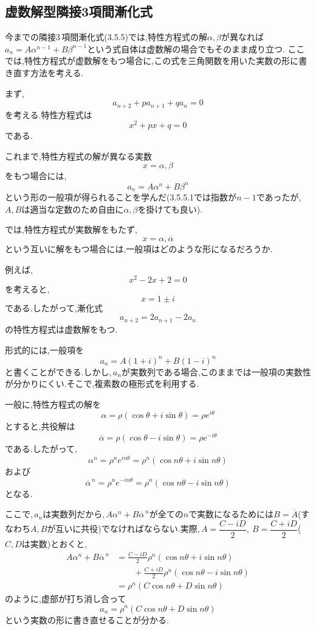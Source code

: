 \subsection{虚数解型隣接3項間漸化式}
  今までの隣接3\,項間漸化式(3.5.5)では,特性方程式の解$\alpha,\beta$が異なれば$a_n=A\alpha^{n-1}+B\beta^{n-1}$という式自体は虚数解の場合でもそのまま成り立つ.
  ここでは,特性方程式が虚数解をもつ場合に,この式を三角関数を用いた実数の形に書き直す方法を考える.

  まず,
  \[
    a_{n+2}+pa_{n+1}+qa_n=0
  \]
  を考える.特性方程式は
  \[
    x^2+px+q=0
  \]
  である.

  これまで,特性方程式の解が異なる実数
  \[
    x=\alpha,\beta
  \]
  をもつ場合には,
  \[
    a_n=A\alpha^n+B\beta^n
  \]
  という形の一般項が得られることを学んだ(3.5.5.1では指数が$n-1$であったが,\,$A,B$は適当な定数のため自由に$\alpha,\beta$を掛けても良い).

  では,特性方程式が実数解をもたず,
  \[
    x=\alpha,\overline{\alpha}
  \]
  という互いに解をもつ場合には,一般項はどのような形になるだろうか.

  例えば,
  \[
    x^2-2x+2=0
  \]
  を考えると,
  \[
    x=1\pm i
  \]
  である.したがって,漸化式
  \[
    a_{n+2}=2a_{n+1}-2a_n
  \]
  の特性方程式は虚数解をもつ.

  形式的には,一般項を
  \[
    a_n=A(1+i)^n+B(1-i)^n
  \]
  と書くことができる.しかし,\,$a_n$が実数列である場合,このままでは一般項の実数性が分かりにくい.そこで,複素数の極形式を利用する.

  一般に,特性方程式の解を
  \[
    \alpha=\rho(\cos\theta+i\sin\theta)=\rho e^{i\theta}
  \]
  とすると,共役解は
  \[
    \overline{\alpha}=\rho(\cos\theta-i\sin\theta)=\rho e^{-i\theta}
  \]
  である.したがって,
  \[
    \alpha^n=\rho^n e^{in\theta}
    =\rho^n(\cos n\theta+i\sin n\theta)
  \]
  および
  \[
    \overline{\alpha}^{\,n}
    =\rho^n e^{-in\theta}
    =\rho^n(\cos n\theta-i\sin n\theta)
  \]
  となる.

  ここで,\,$a_n$は実数列だから,\,$A\alpha^n+B\overline{\alpha}^{\,n}$が全ての$n$で実数になるためには$B=\overline{A}$(すなわち$A,B$が互いに共役)でなければならない.実際,\,$A=\dfrac{C-iD}{2},\ B=\dfrac{C+iD}{2}$(\,$C,D$は実数)とおくと,
  \begin{align*}
    A\alpha^n+B\overline{\alpha}^{\,n}
    &=\frac{C-iD}{2}\rho^n(\cos n\theta+i\sin n\theta)\\
    &\qquad+\frac{C+iD}{2}\rho^n(\cos n\theta-i\sin n\theta)\\
    &=\rho^n(C\cos n\theta+D\sin n\theta)
  \end{align*}
  のように,虚部が打ち消し合って
  \[
    a_n=\rho^n(C\cos n\theta+D\sin n\theta)
  \]
  という実数の形に書き直せることが分かる.

